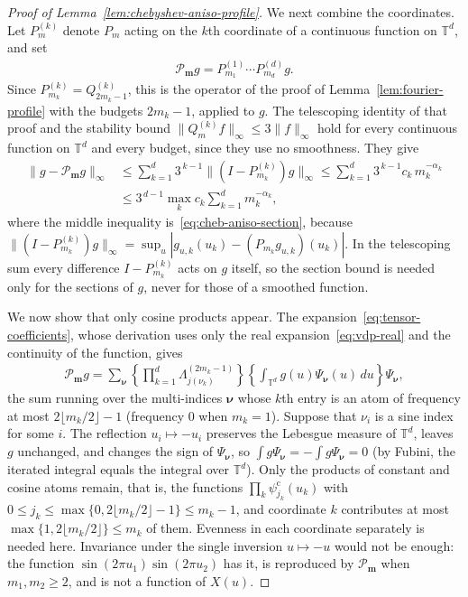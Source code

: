 \begin{proof}[Proof of Lemma~\ref{lem:chebyshev-aniso-profile}]
We next combine the coordinates. Let $P^{(k)}_m$ denote $P_m$ acting on the $k$th coordinate of a continuous function on $\mathbb T^d$, and set
\begin{align*}
\mathcal P_{\boldsymbol m}g=P^{(1)}_{m_1}\cdots P^{(d)}_{m_d}g .
\end{align*}
Since $P^{(k)}_{m_k}=Q^{(k)}_{2m_k-1}$, this is the operator of the proof of Lemma~\ref{lem:fourier-profile} with the budgets $2m_k-1$, applied to $g$. The telescoping identity of that proof and the stability bound $\|Q^{(k)}_mf\|_\infty\leq3\|f\|_\infty$ hold for every continuous function on $\mathbb T^d$ and every budget, since they use no smoothness. They give
\begin{align*}
\|g-\mathcal P_{\boldsymbol m}g\|_\infty
&\leq\sum_{k=1}^d3^{\,k-1}\|(I-P^{(k)}_{m_k})g\|_\infty
\leq\sum_{k=1}^d3^{\,k-1}c_k\,m_k^{-\alpha_k}\\
&\leq3^{\,d-1}\max_kc_k\sum_{k=1}^dm_k^{-\alpha_k},
\end{align*}
where the middle inequality is~\eqref{eq:cheb-aniso-section}, because $\|(I-P^{(k)}_{m_k})g\|_\infty=\sup_u|g_{u,k}(u_k)-(P_{m_k}g_{u,k})(u_k)|$. In the telescoping sum every difference $I-P^{(k)}_{m_k}$ acts on $g$ itself, so the section bound is needed only for the sections of $g$, never for those of a smoothed function.

We now show that only cosine products appear. The expansion~\eqref{eq:tensor-coefficients}, whose derivation uses only the real expansion~\eqref{eq:vdp-real} and the continuity of the function, gives
\begin{align*}
\mathcal P_{\boldsymbol m}g
=\sum_{\boldsymbol\nu}\left\{\prod_{k=1}^d\Lambda^{(2m_k-1)}_{j(\nu_k)}\right\}
\left\{\int_{\mathbb T^d}g(u)\Psi_{\boldsymbol\nu}(u)\,du\right\}\Psi_{\boldsymbol\nu},
\end{align*}
the sum running over the multi-indices $\boldsymbol\nu$ whose $k$th entry is an atom of frequency at most $2\lfloor m_k/2\rfloor-1$ (frequency $0$ when $m_k=1$). Suppose that $\nu_i$ is a sine index for some $i$. The reflection $u_i\mapsto-u_i$ preserves the Lebesgue measure of $\mathbb T^d$, leaves $g$ unchanged, and changes the sign of $\Psi_{\boldsymbol\nu}$, so $\int g\Psi_{\boldsymbol\nu}=-\int g\Psi_{\boldsymbol\nu}=0$ (by Fubini, the iterated integral equals the integral over $\mathbb T^d$). Only the products of constant and cosine atoms remain, that is, the functions $\prod_k\psi^{\mathrm c}_{j_k}(u_k)$ with $0\leq j_k\leq\max\{0,2\lfloor m_k/2\rfloor-1\}\leq m_k-1$, and coordinate $k$ contributes at most $\max\{1,2\lfloor m_k/2\rfloor\}\leq m_k$ of them. Evenness in each coordinate separately is needed here. Invariance under the single inversion $u\mapsto-u$ would not be enough: the function $\sin(2\pi u_1)\sin(2\pi u_2)$ has it, is reproduced by $\mathcal P_{\boldsymbol m}$ when $m_1,m_2\geq2$, and is not a function of $X(u)$.


\end{proof}
